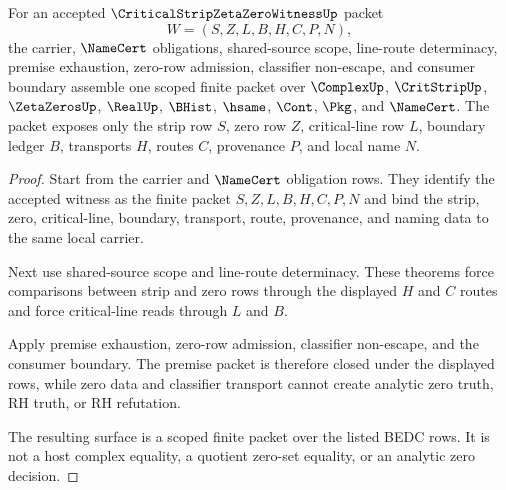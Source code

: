 \begin{theorem}
\label{thm:critical-strip-zeta-zero-scoped-package}
For an accepted $\CriticalStripZetaZeroWitnessUp$ packet
$$
W=(S,Z,L,B,H,C,P,N),
$$
the carrier, $\NameCert$ obligations, shared-source scope, line-route determinacy, premise exhaustion, zero-row admission, classifier non-escape, and consumer boundary assemble one scoped finite packet over $\ComplexUp$, $\CritStripUp$, $\ZetaZerosUp$, $\RealUp$, $\BHist$, $\hsame$, $\Cont$, $\Pkg$, and $\NameCert$. The packet exposes only the strip row $S$, zero row $Z$, critical-line row $L$, boundary ledger $B$, transports $H$, routes $C$, provenance $P$, and local name $N$.
\end{theorem}
\begin{proof}
Start from the carrier and $\NameCert$ obligation rows. They identify the accepted witness as the finite packet $S,Z,L,B,H,C,P,N$ and bind the strip, zero, critical-line, boundary, transport, route, provenance, and naming data to the same local carrier.

Next use shared-source scope and line-route determinacy. These theorems force comparisons between strip and zero rows through the displayed $H$ and $C$ routes and force critical-line reads through $L$ and $B$.

Apply premise exhaustion, zero-row admission, classifier non-escape, and the consumer boundary. The premise packet is therefore closed under the displayed rows, while zero data and classifier transport cannot create analytic zero truth, RH truth, or RH refutation.

The resulting surface is a scoped finite packet over the listed BEDC rows. It is not a host complex equality, a quotient zero-set equality, or an analytic zero decision.
\end{proof}

